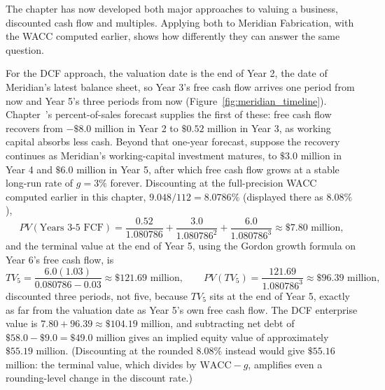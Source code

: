 \documentclass[../ai_in_finance]{subfiles}
\begin{document}
The chapter has now developed both major approaches to valuing a business, discounted cash flow and multiples. Applying both to Meridian Fabrication, with the WACC computed earlier, shows how differently they can answer the same question.

For the DCF approach, the valuation date is the end of Year 2, the date of Meridian's latest balance sheet, so Year 3's free cash flow arrives one period from now and Year 5's three periods from now (Figure~\ref{fig:meridian_timeline}). Chapter~'s percent-of-sales forecast supplies the first of these: free cash flow recovers from $-\$8.0$ million in Year 2 to $\$0.52$ million in Year 3, as working capital absorbs less cash. Beyond that one-year forecast, suppose the recovery continues as Meridian's working-capital investment matures, to $\$3.0$ million in Year 4 and $\$6.0$ million in Year 5, after which free cash flow grows at a stable long-run rate of $g=3\%$ forever. Discounting at the full-precision WACC computed earlier in this chapter, $9.048/112 = 8.0786\%$ (displayed there as $8.08\%$),
\begin{equation*}
PV(\text{Years 3-5 FCF}) = \frac{0.52}{1.080786} + \frac{3.0}{1.080786^2} + \frac{6.0}{1.080786^3} \approx \$7.80 \text{ million},
\end{equation*}
and the terminal value at the end of Year 5, using the Gordon growth formula on Year 6's free cash flow, is
\begin{equation*}
TV_5 = \frac{6.0(1.03)}{0.080786 - 0.03} \approx \$121.69 \text{ million}, \qquad PV(TV_5) = \frac{121.69}{1.080786^3} \approx \$96.39 \text{ million},
\end{equation*}
discounted three periods, not five, because $TV_5$ sits at the end of Year 5, exactly as far from the valuation date as Year 5's own free cash flow. The DCF enterprise value is $7.80 + 96.39 \approx \$104.19$ million, and subtracting net debt of $\$58.0 - \$9.0 = \$49.0$ million gives an implied equity value of approximately $\$55.19$ million. (Discounting at the rounded $8.08\%$ instead would give $\$55.16$ million: the terminal value, which divides by $\text{WACC} - g$, amplifies even a rounding-level change in the discount rate.)
\end{document}
